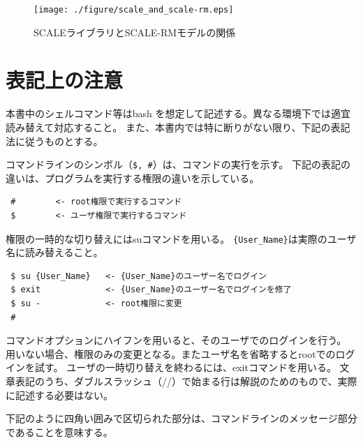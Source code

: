 \begin{figure}[tb]
\begin{center}
  \texttt{[image: ./figure/scale\_and\_scale-rm.eps]}\\
  \caption{SCALEライブラリとSCALE-RMモデルの関係}
  \label{fig:scale-rm}
\end{center}
\end{figure}


\section{表記上の注意}

本書中のシェルコマンド等はbash を想定して記述する。異なる環境下では適宜読み替えて対応すること。
また、本書内では特に断りがない限り、下記の表記法に従うものとする。


コマンドラインのシンボル（\verb|$, #|）は、コマンドの実行を示す。
下記の表記の違いは、プログラムを実行する権限の違いを示している。

\begin{verbatim}
 #        <- root権限で実行するコマンド
 $        <- ユーザ権限で実行するコマンド
\end{verbatim}
権限の一時的な切り替えにはsuコマンドを用いる。
\verb|{User_Name}|は実際のユーザ名に読み替えること。
\begin{verbatim}
 $ su {User_Name}   <- {User_Name}のユーザー名でログイン
 $ exit             <- {User_Name}のユーザー名でログインを修了
 $ su -             <- root権限に変更
 #
\end{verbatim}

コマンドオプションにハイフンを用いると、そのユーザでのログインを行う。
用いない場合、権限のみの変更となる。またユーザ名を省略するとrootでのログインを試す。
ユーザの一時切り替えを終わるには、exitコマンドを用いる。
文章表記のうち、ダブルスラッシュ（//）で始まる行は解説のためのもので、実際に記述する必要はない。

下記のように四角い囲みで区切られた部分は、コマンドラインのメッセージ部分であることを意味する。\\

\\

